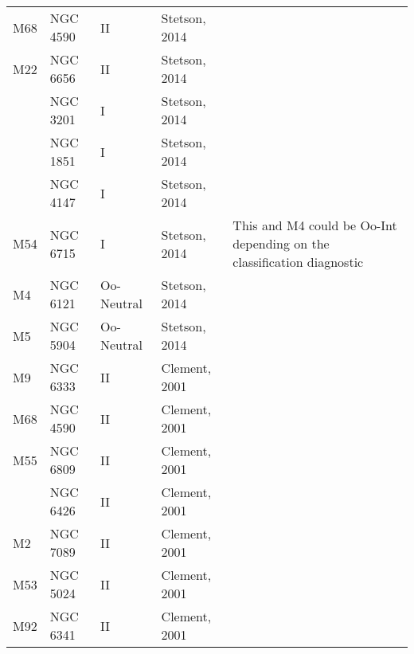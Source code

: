 \documentclass[]{article}
\begin{document}
\begin{longtable}{
	p{1.5cm}|
	p{2.5cm}|
	p{2.5cm}|
	p{3.7cm}|
	p{5.5cm}
	@{}}
		M68            & NGC 4590     & II         & Stetson, 2014        &                                                                        \\
		M22            & NGC 6656     & II         & Stetson, 2014        &                                                                        \\
		& NGC 3201     & I          & Stetson, 2014        &                                                                        \\
		& NGC 1851     & I          & Stetson, 2014        &                                                                        \\
		& NGC 4147     & I          & Stetson, 2014        &                                                                        \\
		M54            & NGC 6715     & I          & Stetson, 2014        & This and M4 could be Oo-Int depending on the classification diagnostic \\
		M4             & NGC 6121     & Oo-Neutral & Stetson, 2014        &                                                                        \\
		M5             & NGC 5904     & Oo-Neutral & Stetson, 2014        &                                                                        \\
		M9             & NGC 6333     & II         & Clement, 2001 \cite{clement_2001_a}        &                                                                        \\
		M68            & NGC 4590     & II         & Clement, 2001        &                                                                        \\
		M55            & NGC 6809     & II         & Clement, 2001        &                                                                        \\
		& NGC 6426     & II         & Clement, 2001        &                                                                        \\
		M2             & NGC 7089     & II         & Clement, 2001        &                                                                        \\
		M53            & NGC 5024     & II         & Clement, 2001        &                                                                        \\
		M92            & NGC 6341     & II         & Clement, 2001        &                                                                        \\

\end{longtable}
\end{document}

